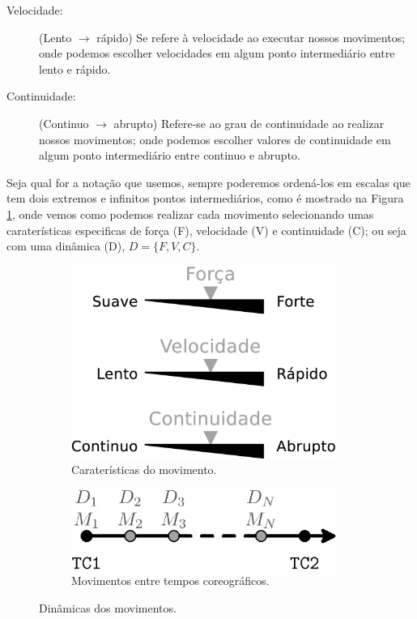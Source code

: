 \begin{description}
\item[Velocidade:] (Lento $\rightarrow$ rápido)
Se refere à velocidade ao executar nossos movimentos;
onde podemos escolher velocidades em algum ponto intermediário entre lento e rápido. 
\item[Continuidade:] (Continuo $\rightarrow$ abrupto)
Refere-se ao grau de continuidade ao realizar nossos movimentos;
onde podemos escolher valores de continuidade em algum ponto intermediário entre continuo e abrupto.
\end{description}
Seja qual for a notação que usemos, sempre poderemos ordená-los em escalas
que tem dois extremos e infinitos pontos intermediários,
como é mostrado na Figura \ref{fig:element:moviment},
onde vemos como podemos realizar cada movimento selecionando umas caraterísticas especificas de força (F), velocidade (V) e continuidade (C);
ou seja com uma dinâmica (D),  $D=\{F, V, C\}$.
\begin{figure}[!h]
\centering
    \begin{subfigure}[b]{0.45\textwidth}
    \centering
    \includegraphics[width=0.95\textwidth]{chapters/cap-musicalidade/dinamicas-elementos1.eps}
    \caption{Caraterísticas do movimento.}
    \label{fig:element:moviment}
    \end{subfigure}
    \hfill
    \begin{subfigure}[b]{0.5\textwidth}
    \centering
    \includegraphics[width=0.95\textwidth]{chapters/cap-musicalidade/dinamicas-elementos1b.eps}
    \caption{Movimentos entre tempos coreográficos.}
    \label{fig:coreografia:moviment}
    \end{subfigure}
\caption{Dinâmicas dos movimentos.}
\label{fig:geral:moviment}
\end{figure}
